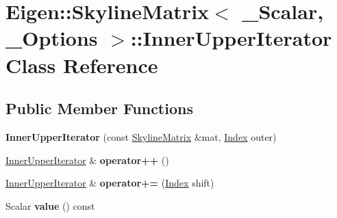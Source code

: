 \hypertarget{class_eigen_1_1_skyline_matrix_1_1_inner_upper_iterator}{}\section{Eigen\+:\+:Skyline\+Matrix$<$ \+\_\+\+Scalar, \+\_\+\+Options $>$\+:\+:Inner\+Upper\+Iterator Class Reference}
\label{class_eigen_1_1_skyline_matrix_1_1_inner_upper_iterator}
\subsection*{Public Member Functions}
\begin{DoxyCompactItemize}
\item 
\mbox{\label{class_eigen_1_1_skyline_matrix_1_1_inner_upper_iterator_a6fa4a02ddd25ea8f600d658e1979be03}} 
{\bfseries Inner\+Upper\+Iterator} (const \hyperlink{class_eigen_1_1_skyline_matrix}{Skyline\+Matrix} \&mat, \hyperlink{group___core___module_a554f30542cc2316add4b1ea0a492ff02}{Index} outer)
\item 
\mbox{\label{class_eigen_1_1_skyline_matrix_1_1_inner_upper_iterator_ab316754776558544c5d7b7fc496c700c}} 
\hyperlink{class_eigen_1_1_skyline_matrix_1_1_inner_upper_iterator}{Inner\+Upper\+Iterator} \& {\bfseries operator++} ()
\item 
\mbox{\label{class_eigen_1_1_skyline_matrix_1_1_inner_upper_iterator_af25495a640d0dfbf6abe0e21e4e283d6}} 
\hyperlink{class_eigen_1_1_skyline_matrix_1_1_inner_upper_iterator}{Inner\+Upper\+Iterator} \& {\bfseries operator+=} (\hyperlink{group___core___module_a554f30542cc2316add4b1ea0a492ff02}{Index} shift)
\item 
\mbox{\label{class_eigen_1_1_skyline_matrix_1_1_inner_upper_iterator_aa82ff235d67c9d1ecab267562ea9e7f2}} 
Scalar {\bfseries value} () const
\item 
\mbox{\label{class_eigen_1_1_skyline_matrix_1_1_inner_upper_iterator_ad5413dc939db8afe741729bfd3667084}} 

\end{DoxyCompactItemize}
